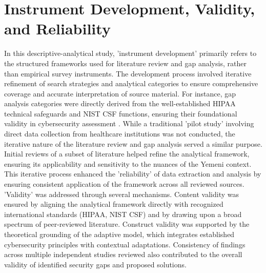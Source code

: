 \documentclass[12pt, a4paper, oneside]{report}
\begin{document}
	\section{Instrument Development, Validity, and Reliability}
	In this descriptive-analytical study, 'instrument development' primarily refers to the structured frameworks used for literature review and gap analysis, rather than empirical survey instruments. The development process involved iterative refinement of search strategies and analytical categories to ensure comprehensive coverage and accurate interpretation of source material. For instance, gap analysis categories were directly derived from the well-established HIPAA technical safeguards and NIST CSF functions, ensuring their foundational validity in cybersecurity assessment \cite{hhs2024hipaa} \cite{rahmany2026aida}. While a traditional 'pilot study' involving direct data collection from healthcare institutions was not conducted, the iterative nature of the literature review and gap analysis served a similar purpose. Initial reviews of a subset of literature helped refine the analytical framework, ensuring its applicability and sensitivity to the nuances of the Yemeni context. This iterative process enhanced the 'reliability' of data extraction and analysis by ensuring consistent application of the framework across all reviewed sources. 'Validity' was addressed through several mechanisms. Content validity was ensured by aligning the analytical framework directly with recognized international standards (HIPAA, NIST CSF) and by drawing upon a broad spectrum of peer-reviewed literature. Construct validity was supported by the theoretical grounding of the adaptive model, which integrates established cybersecurity principles with contextual adaptations. Consistency of findings across multiple independent studies reviewed also contributed to the overall validity of identified security gaps and proposed solutions.
	
\end{document}
